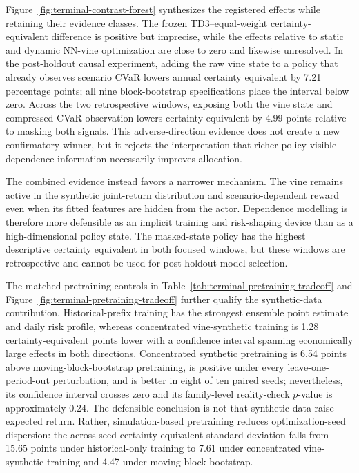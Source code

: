 Figure~\ref{fig:terminal-contrast-forest} synthesizes the registered effects while retaining their evidence classes. The frozen TD3--equal-weight certainty-equivalent difference is positive but imprecise, while the effects relative to static and dynamic NN-vine optimization are close to zero and likewise unresolved. In the post-holdout causal experiment, adding the raw vine state to a policy that already observes scenario CVaR lowers annual certainty equivalent by 7.21 percentage points; all nine block-bootstrap specifications place the interval below zero. Across the two retrospective windows, exposing both the vine state and compressed CVaR observation lowers certainty equivalent by 4.99 points relative to masking both signals. This adverse-direction evidence does not create a new confirmatory winner, but it rejects the interpretation that richer policy-visible dependence information necessarily improves allocation.

The combined evidence instead favors a narrower mechanism. The vine remains active in the synthetic joint-return distribution and scenario-dependent reward even when its fitted features are hidden from the actor. Dependence modelling is therefore more defensible as an implicit training and risk-shaping device than as a high-dimensional policy state. The masked-state policy has the highest descriptive certainty equivalent in both focused windows, but these windows are retrospective and cannot be used for post-holdout model selection.

The matched pretraining controls in Table~\ref{tab:terminal-pretraining-tradeoff} and Figure~\ref{fig:terminal-pretraining-tradeoff} further qualify the synthetic-data contribution. Historical-prefix training has the strongest ensemble point estimate and daily risk profile, whereas concentrated vine-synthetic training is 1.28 certainty-equivalent points lower with a confidence interval spanning economically large effects in both directions. Concentrated synthetic pretraining is 6.54 points above moving-block-bootstrap pretraining, is positive under every leave-one-period-out perturbation, and is better in eight of ten paired seeds; nevertheless, its confidence interval crosses zero and its family-level reality-check $p$-value is approximately 0.24. The defensible conclusion is not that synthetic data raise expected return. Rather, simulation-based pretraining reduces optimization-seed dispersion: the across-seed certainty-equivalent standard deviation falls from 15.65 points under historical-only training to 7.61 under concentrated vine-synthetic training and 4.47 under moving-block bootstrap.

